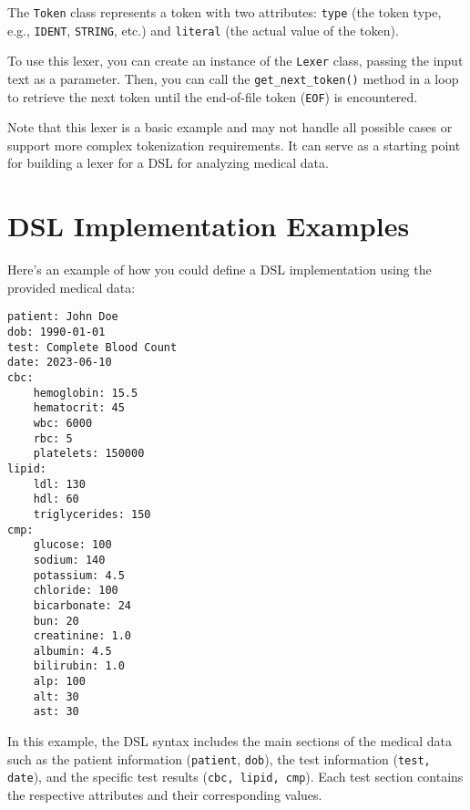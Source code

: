 The \texttt{Token} class represents a token with two attributes: \texttt{type} (the token type, e.g., \texttt{IDENT}, \texttt{STRING}, etc.) and \texttt{literal} (the actual value of the token).

To use this lexer, you can create an instance of the \texttt{Lexer} class, passing the input text as a parameter. Then, you can call the \texttt{get\_next\_token()} method in a loop to retrieve the next token until the end-of-file token (\texttt{EOF}) is encountered.

Note that this lexer is a basic example and may not handle all possible cases or support more complex tokenization requirements. It can serve as a starting point for building a lexer for a DSL for analyzing medical data.


\vspace{0.5cm}
\section{DSL Implementation Examples}

Here's an example of how you could define a DSL implementation using the provided medical data:

\begin{lstlisting}
patient: John Doe
dob: 1990-01-01
test: Complete Blood Count
date: 2023-06-10
cbc:
    hemoglobin: 15.5
    hematocrit: 45
    wbc: 6000
    rbc: 5
    platelets: 150000
lipid:
    ldl: 130
    hdl: 60
    triglycerides: 150
cmp:
    glucose: 100
    sodium: 140
    potassium: 4.5
    chloride: 100
    bicarbonate: 24
    bun: 20
    creatinine: 1.0
    albumin: 4.5
    bilirubin: 1.0
    alp: 100
    alt: 30
    ast: 30
\end{lstlisting}

In this example, the DSL syntax includes the main sections of the medical data such as the patient information (\texttt{patient}, \texttt{dob}), the test information (\texttt{test, date}), and the specific test results (\texttt{cbc, lipid, cmp}). Each test section contains the respective attributes and their corresponding values.
